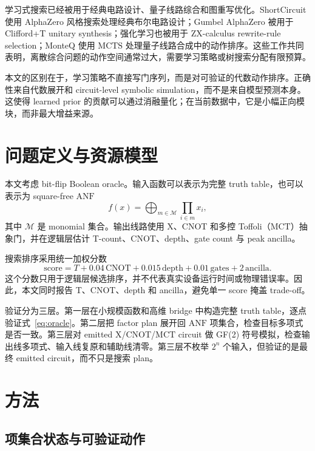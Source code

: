 \documentclass[UTF8,fontset=macnew,11pt]{ctexart}
\newcommand{\anf}{\ensuremath{\mathrm{ANF}}}
\newcommand{\mcts}{\ensuremath{\mathrm{MCTS}}}
\newcommand{\mct}{\ensuremath{\mathrm{MCT}}}
\newcommand{\score}{\ensuremath{\mathrm{score}}}
\newcommand{\ttable}{truth table}
\begin{document}
学习式搜索已经被用于经典电路设计、量子线路综合和图重写优化。ShortCircuit 使用 AlphaZero 风格搜索处理经典布尔电路设计\cite{tsaras2024shortcircuit}；Gumbel AlphaZero 被用于 Clifford+T unitary synthesis\cite{rietsch2024unitary}；强化学习也被用于 ZX-calculus rewrite-rule selection\cite{riu2025rlzx}；MonteQ 使用 \mcts{} 处理量子线路合成中的动作排序\cite{machiya2026monteq}。这些工作共同表明，离散综合问题的动作空间通常过大，需要学习策略或树搜索分配有限预算。

本文的区别在于，学习策略不直接写门序列，而是对可验证的代数动作排序。正确性来自代数展开和 circuit-level symbolic simulation，而不是来自模型预测本身。这使得 learned prior 的贡献可以通过消融量化；在当前数据中，它是小幅正向模块，而非最大增益来源。

\section{问题定义与资源模型}

本文考虑 bit-flip Boolean oracle。输入函数可以表示为完整 \ttable{}，也可以表示为 square-free \anf{}
\begin{equation}
  f(x)=\bigoplus_{m\in\mathcal{M}}\prod_{i\in m}x_i ,
  \label{eq:anf}
\end{equation}
其中 $\mathcal{M}$ 是 monomial 集合。输出线路使用 X、CNOT 和多控 Toffoli（\mct{}）抽象门，并在逻辑层估计 T-count、CNOT、depth、gate count 与 peak ancilla。

搜索排序采用统一加权分数
\begin{equation}
  \score = T + 0.04\,\mathrm{CNOT} + 0.015\,\mathrm{depth}
         + 0.01\,\mathrm{gates} + 2\,\mathrm{ancilla}.
  \label{eq:score}
\end{equation}
这个分数只用于逻辑层候选排序，并不代表真实设备运行时间或物理错误率。因此，本文同时报告 T、CNOT、depth 和 ancilla，避免单一 score 掩盖 trade-off。

验证分为三层。第一层在小规模函数和高维 bridge 中构造完整 \ttable{}，逐点验证式~\eqref{eq:oracle}。第二层把 factor plan 展开回 \anf{} 项集合，检查目标多项式是否一致。第三层对 emitted X/CNOT/\mct{} circuit 做 GF(2) 符号模拟，检查输出线多项式、输入线复原和辅助线清零。第三层不枚举 $2^n$ 个输入，但验证的是最终 emitted circuit，而不只是搜索 plan。

\section{方法}

\subsection{项集合状态与可验证动作}
\end{document}
